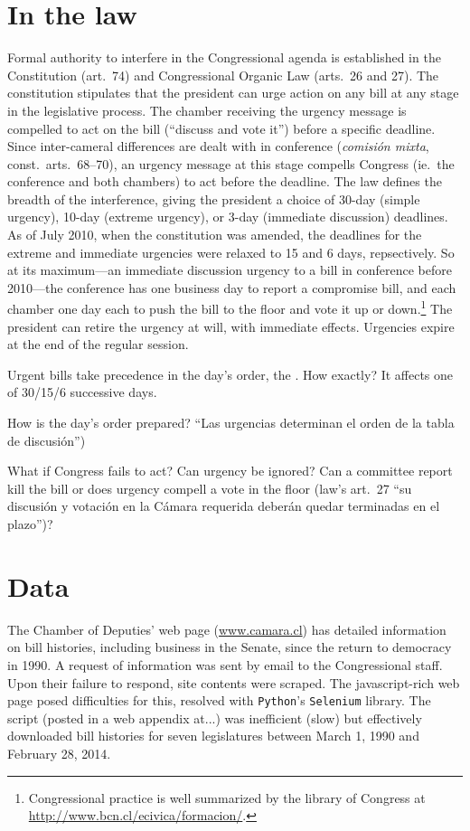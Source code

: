 \documentclass[letter,12pt]{article}
\begin{document}
\section{In the law}

Formal authority to interfere in the Congressional agenda is established in the Constitution (art.\ 74) and Congressional Organic Law (arts.\ 26 and 27). The constitution stipulates that the president can urge action on any bill at any stage in the legislative process. The chamber receiving the urgency message is compelled to act on the bill (``discuss and vote it'') before a specific deadline. Since inter-cameral differences are dealt with in conference (\emph{comisión mixta}, const.\ arts.\ 68--70), an urgency message at this stage compells Congress (ie.\ the conference and both chambers) to act before the deadline. The law defines the breadth of the interference, giving the president a choice of 30-day (simple urgency), 10-day (extreme urgency), or 3-day (immediate discussion) deadlines. As of July 2010, when the constitution was amended, the deadlines for the extreme and immediate urgencies were relaxed to 15 and 6 days, repsectively. So at its maximum---an immediate discussion urgency to a bill in conference before 2010---the conference has one business day to report a compromise bill, and each chamber one day each to push the bill to the floor and vote it up or down.\footnote{Congressional practice is well summarized by the library of Congress at \url{http://www.bcn.cl/ecivica/formacion/}.} The president can retire the urgency at will, with immediate effects. Urgencies expire at the end of the regular session. 

Urgent bills take precedence in the day's order, the . How exactly? It affects one of 30/15/6 successive days. 

How is the day's order prepared? ``Las urgencias determinan el orden de la tabla de discusión'')

What if Congress fails to act? Can urgency be ignored? Can a committee report kill the bill or does urgency compell a vote in the floor (law's art.\ 27 ``su discusión y votación en la Cámara requerida deberán quedar terminadas en el plazo'')?

\section{Data}

The Chamber of Deputies' web page (\url{www.camara.cl}) has detailed information on bill histories, including business in the Senate, since the return to democracy in 1990. A request of information was sent by email to the Congressional staff. Upon their failure to respond, site contents were scraped. The javascript-rich web page posed difficulties for this, resolved with \texttt{Python}'s \texttt{Selenium} library. The script (posted in a web appendix at...) was inefficient (slow) but effectively downloaded bill histories for seven legislatures between March 1, 1990 and February 28, 2014. 
\end{document}
